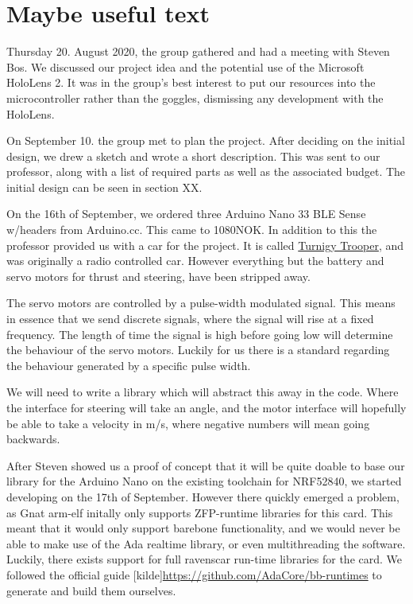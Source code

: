 \documentclass{article}
\begin{document}
\maketitle

\section{Maybe useful text}

Thursday 20. August 2020, the group gathered and had a meeting with Steven Bos. We discussed our project idea and the potential use of the Microsoft HoloLens 2. It was in the group's best interest to put our resources into the microcontroller rather than the goggles, dismissing any development with the HoloLens.

\vspace{5mm}
On September 10. the group met to plan the project. After deciding on the initial design, we drew a sketch and wrote a short description. This was sent to our professor, along with a list of required parts as well as the associated budget. The initial design can be seen in section XX.

\vspace{5mm}

On the 16th of September, we ordered three Arduino Nano 33 BLE Sense w/headers from Arduino.cc. This came to 1080NOK. In addition to this the professor provided us with a car for the project. It is called \href{https://hobbyking.com/en_us/turnigy-trooper-sct-4x4-1-10-brushless-short-course-truck-arr.html?___store=en_us}{Turnigy Trooper}, and was originally a radio controlled car. However everything but the battery and servo motors for thrust and steering, have been stripped away. 

The servo motors are controlled by a pulse-width modulated signal. This means in essence that we send discrete signals, where the signal will rise at a fixed frequency. The length of time the signal is high before going low will determine the behaviour of the servo motors. Luckily for us there is a standard regarding the behaviour generated by a specific pulse width. 

We will need to write a library which will abstract this away in the code. Where the interface for steering will take an angle, and the motor interface will hopefully be able to take a velocity in m/s, where negative numbers will mean going backwards.

\vspace{5mm}
After Steven showed us a proof of concept that it will be quite doable to base our library for the Arduino Nano on the existing toolchain for NRF52840, we started developing on the 17th of September. However there quickly emerged a problem, as Gnat arm-elf initally only supports ZFP-runtime libraries for this card. This meant that it would only support barebone functionality, and we would never be able to make use of the Ada realtime library, or even multithreading the software. Luckily, there exists support for full ravenscar run-time libraries for the card. We followed the official guide [kilde]\url{https://github.com/AdaCore/bb-runtimes} to generate and build them ourselves.
\end{document}
